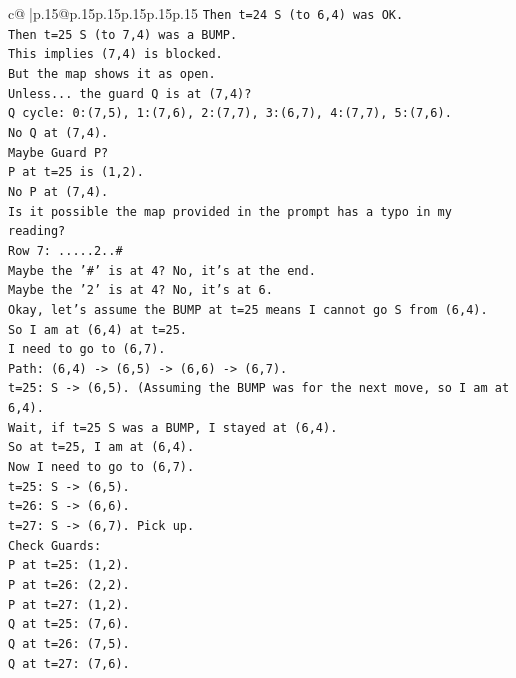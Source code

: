 \documentclass{article}
\begin{document}
{\begin{supertabular}{c@{$\;$}|p{.15\linewidth}@{}p{.15\linewidth}p{.15\linewidth}p{.15\linewidth}p{.15\linewidth}p{.15\linewidth}}
{{{\texttt{Then t=24 S (to 6,4) was OK.} \\
\texttt{Then t=25 S (to 7,4) was a BUMP.} \\
\texttt{This implies (7,4) is blocked.} \\
\texttt{But the map shows it as open.} \\
\texttt{Unless... the guard Q is at (7,4)?} \\
\texttt{Q cycle: 0:(7,5), 1:(7,6), 2:(7,7), 3:(6,7), 4:(7,7), 5:(7,6).} \\
\texttt{No Q at (7,4).} \\
\texttt{Maybe Guard P?} \\
\texttt{P at t=25 is (1,2).} \\
\texttt{No P at (7,4).} \\
\texttt{Is it possible the map provided in the prompt has a typo in my reading?} \\
\texttt{Row 7: .....2..\#} \\
\texttt{Maybe the '\#' is at 4? No, it's at the end.} \\
\texttt{Maybe the '2' is at 4? No, it's at 6.} \\
\texttt{Okay, let's assume the BUMP at t=25 means I cannot go S from (6,4).} \\
\texttt{So I am at (6,4) at t=25.} \\
\texttt{I need to go to (6,7).} \\
\texttt{Path: (6,4) {-}> (6,5) {-}> (6,6) {-}> (6,7).} \\
\texttt{t=25: S {-}> (6,5). (Assuming the BUMP was for the next move, so I am at 6,4).} \\
\texttt{Wait, if t=25 S was a BUMP, I stayed at (6,4).} \\
\texttt{So at t=25, I am at (6,4).} \\
\texttt{Now I need to go to (6,7).} \\
\texttt{t=25: S {-}> (6,5).} \\
\texttt{t=26: S {-}> (6,6).} \\
\texttt{t=27: S {-}> (6,7). Pick up.} \\
\texttt{Check Guards:} \\
\texttt{P at t=25: (1,2).} \\
\texttt{P at t=26: (2,2).} \\
\texttt{P at t=27: (1,2).} \\
\texttt{Q at t=25: (7,6).} \\
\texttt{Q at t=26: (7,5).} \\
\texttt{Q at t=27: (7,6).} \\
}}}
\end{supertabular}}
\end{document}
